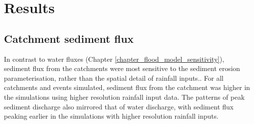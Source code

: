 %
%

\section{Results}
\subsection{Catchment sediment flux}
In contrast to water fluxes (Chapter \ref{chapter_flood_model_sensitivity}), sediment flux from the catchments were most sensitive to the sediment erosion parameterisation, rather than the spatial detail of rainfall inputs.. For all catchments and events simulated, sediment flux from the catchment was higher in the simulations using higher resolution rainfall input data. The patterns of peak sediment discharge also mirrored that of water discharge, with sediment flux peaking earlier in the simulations with higher resolution rainfall inputs. 

